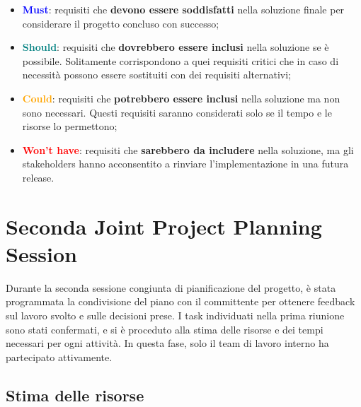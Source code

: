 \documentclass[a4paper,12pt, openright]{report}
\begin{document}
\begin{itemize}
    \item \textcolor{blue}{\textbf{Must}}: requisiti che \textbf{devono essere soddisfatti} nella soluzione finale per considerare il progetto concluso con successo;
    \item \textcolor{teal}{\textbf{Should}}: requisiti che \textbf{dovrebbero essere inclusi} nella soluzione se è possibile. Solitamente corrispondono a quei requisiti critici che in caso di necessità possono essere sostituiti con dei requisiti alternativi;
    \item \textcolor{orange}{\textbf{Could}}: requisiti che \textbf{potrebbero essere inclusi} nella soluzione ma non sono necessari. Questi requisiti saranno considerati solo se il tempo e le risorse lo permettono;
    \item \textcolor{red}{\textbf{Won’t have}}: requisiti che \textbf{sarebbero da includere} nella soluzione, ma gli stakeholders hanno acconsentito a rinviare l'implementazione in una futura release.
\end{itemize}

\section{Seconda Joint Project Planning Session}

Durante la seconda sessione congiunta di pianificazione del progetto, è stata programmata la condivisione del piano con il committente per ottenere feedback sul lavoro svolto e sulle decisioni prese. I task individuati nella prima riunione sono stati confermati, e si è proceduto alla stima delle risorse e dei tempi necessari per ogni attività. In questa fase, solo il team di lavoro interno ha partecipato attivamente.

\subsection{Stima delle risorse}
\end{document}
